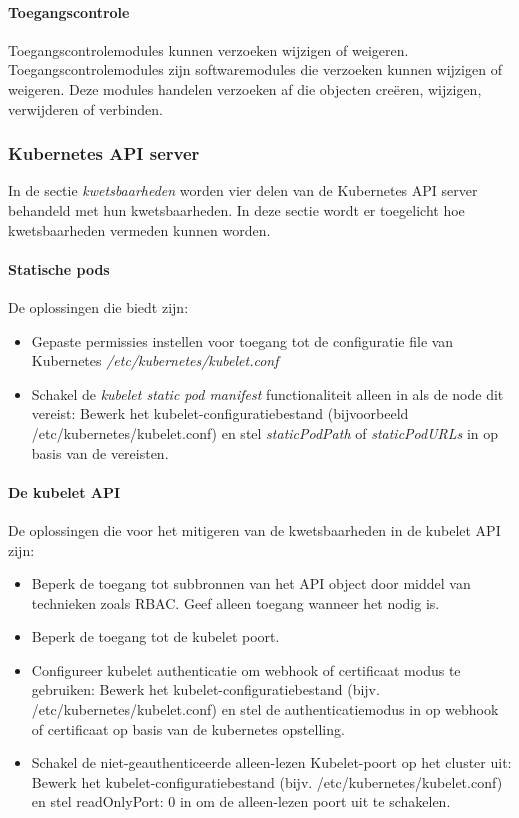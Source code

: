 \paragraph{Toegangscontrole}
Toegangscontrolemodules kunnen verzoeken wijzigen of weigeren. Toegangscontrolemodules zijn softwaremodules die verzoeken kunnen wijzigen of weigeren. Deze modules   handelen verzoeken af die objecten creëren, wijzigen, verwijderen of verbinden. 

\subsubsection{Kubernetes API server}
In de sectie \textit{kwetsbaarheden} worden vier delen van de Kubernetes API server behandeld met hun kwetsbaarheden. In deze sectie wordt er toegelicht hoe kwetsbaarheden vermeden kunnen worden.

\paragraph{Statische pods}
De oplossingen die \textcite{KubernetesDocs-2023} biedt zijn:
\begin{itemize}
    \item Gepaste permissies instellen voor toegang tot de configuratie file van Kubernetes \textit{/etc/kubernetes/kubelet.conf} 
    \item Schakel de \textit{kubelet static pod manifest} functionaliteit alleen in als de node dit vereist: Bewerk het kubelet-configuratiebestand (bijvoorbeeld /etc/kubernetes/kubelet.conf) en stel \textit{staticPodPath} of \textit{staticPodURLs} in op basis van de vereisten.
\end{itemize}

\paragraph{De kubelet API}
De oplossingen die \textcite{KubernetesDocs-2023} 
 voor het mitigeren van de kwetsbaarheden in de kubelet API zijn:
\begin{itemize}
    \item Beperk de toegang tot subbronnen van het API object door middel van technieken zoals RBAC. Geef alleen toegang wanneer het nodig is.
    \item Beperk de toegang tot de kubelet poort.
    \item Configureer kubelet authenticatie om webhook of certificaat modus te gebruiken: Bewerk het kubelet-configuratiebestand (bijv. /etc/kubernetes/kubelet.conf) en stel de authenticatiemodus in op webhook of certificaat op basis van de kubernetes opstelling.
    \item Schakel de niet-geauthenticeerde alleen-lezen Kubelet-poort op het cluster uit: Bewerk het kubelet-configuratiebestand (bijv. /etc/kubernetes/kubelet.conf) en stel readOnlyPort: 0 in om de alleen-lezen poort uit te schakelen.
\end{itemize}

